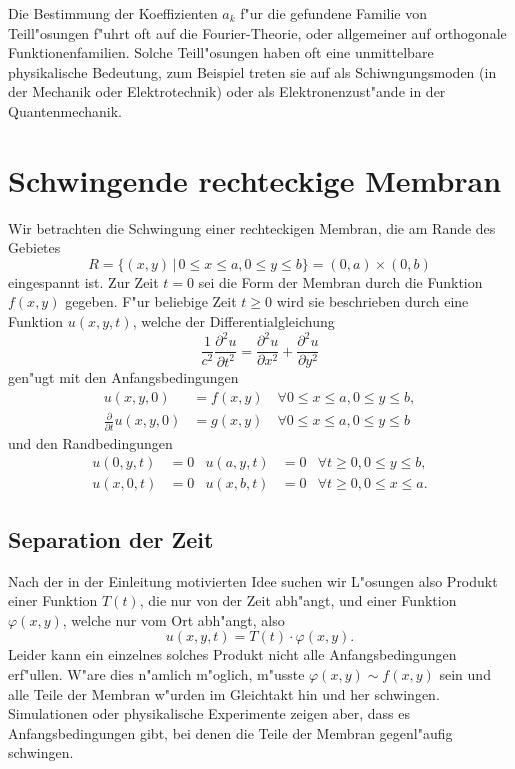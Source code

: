 Die Bestimmung der Koeffizienten $a_k$ f"ur die gefundene Familie
von Teill"osungen f"uhrt oft auf die Fourier-Theorie, oder allgemeiner
auf orthogonale Funktionenfamilien. Solche Teill"osungen haben oft eine
unmittelbare physikalische Bedeutung, zum Beispiel treten sie auf als
Schiwngungsmoden (in der Mechanik oder Elektrotechnik) oder als
Elektronenzust"ande in der Quantenmechanik.

\section{Schwingende rechteckige Membran}
Wir betrachten die Schwingung einer rechteckigen Membran, die am Rande
des Gebietes
\[
R=\{(x,y)\,|\,0\le x\le a,0\le y\le b\} =(0,a)\times(0,b)
\]
eingespannt ist. Zur Zeit $t=0$ sei die Form der Membran durch die
Funktion $f(x,y)$ gegeben.
F"ur beliebige Zeit $t\ge 0$ wird sie beschrieben durch eine Funktion $u(x,y,t)$,
welche der Differentialgleichung
\[
\frac1{c^2}\frac{\partial^2u}{\partial t^2}=\frac{\partial^2u}{\partial x^2}+\frac{\partial^2u}{\partial y^2}
\]
gen"ugt mit den Anfangsbedingungen
\begin{align*}
u(x,y,0)&=f(x,y)\quad\forall 0\le x\le a,0\le y\le b,
\\
\frac{\partial}{\partial t}u(x,y,0)&=g(x,y)\quad\forall 0\le x\le a,0\le y\le b
\end{align*}
und den Randbedingungen
\begin{align*}
u(0,y,t)&=0&u(a,y,t)&=0&\forall t\ge 0,0\le y\le b,\\
u(x,0,t)&=0&u(x,b,t)&=0&\forall t\ge 0,0\le x\le a.
\end{align*}

\subsection{Separation der Zeit}
Nach der in der Einleitung motivierten Idee suchen wir L"osungen also
Produkt einer Funktion $T(t)$, die nur von der Zeit abh"angt, und einer Funktion
$\varphi(x,y)$, welche nur vom Ort abh"angt, also
\[
u(x,y,t)=T(t)\cdot\varphi(x,y).
\]
Leider kann ein einzelnes solches Produkt nicht alle Anfangsbedingungen
erf"ullen. W"are dies n"amlich m"oglich, m"usste $\varphi(x,y)\sim f(x,y)$
sein und alle Teile der Membran w"urden im Gleichtakt hin und her schwingen.
Simulationen oder physikalische Experimente zeigen aber, dass es
Anfangsbedingungen gibt, bei denen die Teile der Membran gegenl"aufig
schwingen.


